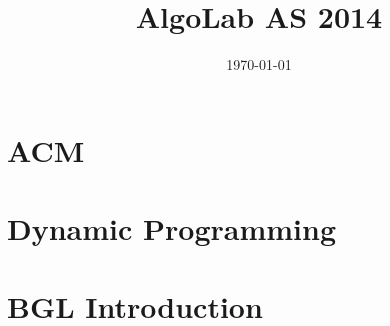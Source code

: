 \documentclass[a4paper,titlepage]{article}
\author{}
\title{AlgoLab AS 2014}
\date{\today}
\newcommand{\topic}[1]{\index{#1}#1}
\newcommand{\expdf}[3]{\newpage}
\begin{document}
\maketitle
\tableofcontents
\newpage
\setcounter{page}{1}

\section{ACM}
\expdf{Even Pairs}{\topic{test1}, \topic{test2}}{even-pairs/even_pairs.pdf}


\expdf{Build The Sum}{\topic{test1}, \topic{test2}}{build-the-sum/build_sum.pdf}


\expdf{Shelves}{}{shelves/shelves.pdf}


\expdf{Checking Change}{}{checking-change/checking_change.pdf}


\expdf{Even Matrices}{}{even-matrices/even_matrices.pdf}

\expdf{Race Tracks}{}{race-tracks/race_tracks.pdf}


\expdf{Boats}{}{boats/boats.pdf}


\expdf{Aliens}{}{aliens/aliens.pdf}


\expdf{Next Path}{}{next-path/next_path.pdf}


\section{Dynamic Programming}
\expdf{Longest Path}{}{longest-path/longest_path.pdf}


\expdf{Light Pattern}{}{light-pattern/light_pattern.pdf}


\expdf{Burning Coins}{}{burning-coins/burning_coins.pdf}


\expdf{Poker Chips}{}{pokerchips/poker_chips.pdf}


\section{BGL Introduction}
\expdf{Building a Graph}{}{building-a-graph/bgl_intro.pdf}
\end{document}

